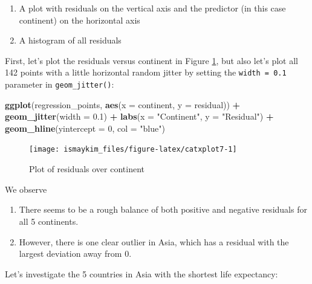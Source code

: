 \documentclass[12pt, krantz2,]{krantz}
\makeatletter
\newenvironment{Shaded}{\begin{snugshade}}{\end{snugshade}}
\newcommand{\DataTypeTok}[1]{\textcolor[rgb]{0.27,0.27,0.27}{#1}}
\newcommand{\DecValTok}[1]{\textcolor[rgb]{0.06,0.06,0.06}{#1}}
\newcommand{\FloatTok}[1]{\textcolor[rgb]{0.06,0.06,0.06}{#1}}
\newcommand{\KeywordTok}[1]{\textcolor[rgb]{0.27,0.27,0.27}{\textbf{#1}}}
\newcommand{\NormalTok}[1]{#1}
\newcommand{\OperatorTok}[1]{\textcolor[rgb]{0.43,0.43,0.43}{\textbf{#1}}}
\newcommand{\StringTok}[1]{\textcolor[rgb]{0.5,0.5,0.5}{#1}}
\providecommand{\tightlist}{%
  \setlength{\itemsep}{0pt}\setlength{\parskip}{0pt}}
\newenvironment{kframe}{%
\medskip{}
\setlength{\fboxsep}{.8em}
 \def\at@end@of@kframe{}%
 \ifinner\ifhmode%
  \def\at@end@of@kframe{\end{minipage}}%
  \begin{minipage}{\columnwidth}%
 \fi\fi%
 \def\FrameCommand##1{\hskip\@totalleftmargin \hskip-\fboxsep
 \colorbox{shadecolor}{##1}\hskip-\fboxsep
     \hskip-\linewidth \hskip-\@totalleftmargin \hskip\columnwidth}%
 \MakeFramed {\advance\hsize-\width
   \@totalleftmargin\z@ \linewidth\hsize
   \@setminipage}}%
 {\par\unskip\endMakeFramed%
 \at@end@of@kframe}
\renewenvironment{Shaded}{\begin{kframe}}{\end{kframe}}
\makeatother
\begin{document}
\begin{enumerate}
\def\labelenumi{\arabic{enumi}.}
\tightlist
\item
  A plot with residuals on the vertical axis and the predictor (in this case continent) on the horizontal axis
\item
  A histogram of all residuals
\end{enumerate}

First, let's plot the residuals versus continent in Figure \ref{fig:catxplot7}, but also let's plot all 142 points with a little horizontal random jitter by setting the \texttt{width\ =\ 0.1} parameter in \texttt{geom\_jitter()}:

\begin{Shaded}
\begin{Highlighting}[]
\KeywordTok{ggplot}\NormalTok{(regression_points, }\KeywordTok{aes}\NormalTok{(}\DataTypeTok{x =}\NormalTok{ continent, }\DataTypeTok{y =}\NormalTok{ residual)) }\OperatorTok{+}
\StringTok{  }\KeywordTok{geom_jitter}\NormalTok{(}\DataTypeTok{width =} \FloatTok{0.1}\NormalTok{) }\OperatorTok{+}\StringTok{ }
\StringTok{  }\KeywordTok{labs}\NormalTok{(}\DataTypeTok{x =} \StringTok{"Continent"}\NormalTok{, }\DataTypeTok{y =} \StringTok{"Residual"}\NormalTok{) }\OperatorTok{+}
\StringTok{  }\KeywordTok{geom_hline}\NormalTok{(}\DataTypeTok{yintercept =} \DecValTok{0}\NormalTok{, }\DataTypeTok{col =} \StringTok{"blue"}\NormalTok{)}
\end{Highlighting}
\end{Shaded}

\begin{figure}

{\centering \texttt{[image: ismaykim\_files/figure-latex/catxplot7-1]} 

}

\caption{Plot of residuals over continent}\label{fig:catxplot7}
\end{figure}

We observe

\begin{enumerate}
\def\labelenumi{\arabic{enumi}.}
\tightlist
\item
  There seems to be a rough balance of both positive and negative residuals for all 5 continents.
\item
  However, there is one clear outlier in Asia, which has a residual with the largest deviation away from 0.
\end{enumerate}

Let's investigate the 5 countries in Asia with the shortest life expectancy:
\end{document}

